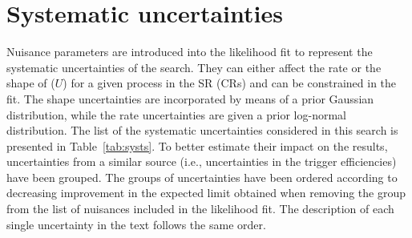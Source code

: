 \section{Systematic uncertainties}

Nuisance parameters are introduced into the likelihood fit to represent the systematic uncertainties of the search. They can either affect the rate or  the shape of \ptmiss ($U$) for a given process in the SR (CRs) and can be constrained in the fit. The shape uncertainties are incorporated by means of a prior Gaussian distribution, while the rate uncertainties are given a prior log-normal distribution. The list of the systematic uncertainties considered in this search is presented in Table~\ref{tab:systs}. To better estimate their impact on the results, uncertainties from a similar source (i.e., uncertainties in the trigger efficiencies) have been grouped. The groups of uncertainties have been ordered according to decreasing improvement in the expected limit obtained when removing the group from the list of nuisances included in the likelihood fit. The description of each single uncertainty in the text follows the same order.

